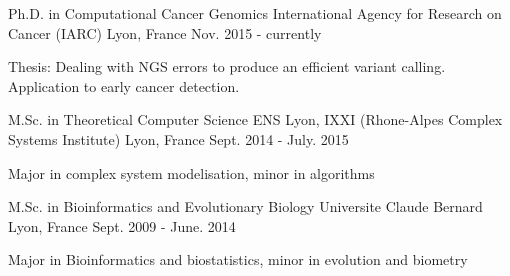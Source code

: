 

\begin{cventries}

      \cventry
    {Ph.D. in Computational Cancer Genomics} %
    {International Agency for Research on Cancer (IARC)} %
    {Lyon, France} %
    {Nov. 2015 - currently} %
    {
      \begin{cvitems} %
        \item {Thesis: Dealing with NGS errors to produce an efficient variant calling. Application to early cancer detection.}
      \end{cvitems}
    }
    
      \cventry
    {M.Sc. in Theoretical Computer Science} %
    {ENS Lyon, IXXI (Rhone-Alpes Complex Systems Institute) } %
    {Lyon, France} %
    {Sept. 2014 - July. 2015} %
    {
      \begin{cvitems} %
        \item {Major in complex system modelisation, minor in algorithms}
      \end{cvitems}
    }
    
    \cventry
    {M.Sc. in Bioinformatics and Evolutionary Biology} %
    {Universite Claude Bernard } %
    {Lyon, France} %
    {Sept. 2009 - June. 2014} %
    {
      \begin{cvitems} %
        \item {Major in Bioinformatics and biostatistics, minor in evolution and biometry}
      \end{cvitems}
    }

\end{cventries}
